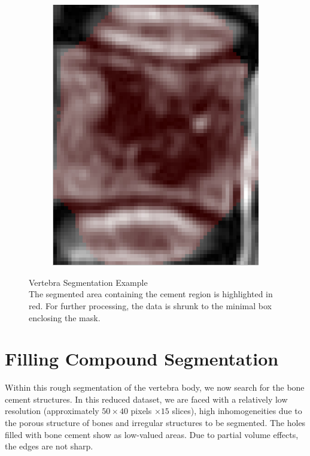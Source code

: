 \documentclass{article}
\begin{document}
{\begin{figure}[h]
\begin{subfigure}[t]{0.45\linewidth}
	\end{subfigure}
	\hfill
	\begin{subfigure}[t]{0.45\linewidth}
		\centering
		\includegraphics[scale=0.4]{VertebraSegmentationExample_2.png}
	\end{subfigure}
	\caption{Vertebra Segmentation Example\\
		The segmented area containing the cement region is highlighted in red. For further processing, the data is shrunk to the minimal box enclosing the mask.}
	\end{figure} 
  }	
  \pagebreak
  \section{Filling Compound Segmentation}
  
  Within this rough segmentation of the vertebra body, we now search for the bone cement structures.
  In this reduced dataset, we are faced with a relatively low resolution (approximately $50 \times 40$ pixels $\times 15$ slices), high inhomogeneities due to the porous structure of bones and irregular structures to be segmented.
  The holes filled with bone cement show as low-valued areas.
  Due to partial volume effects, the edges are not sharp. 
  
\end{document}
